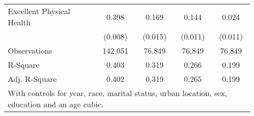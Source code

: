 \documentclass[border=3mm,preview]{standalone}
\begin{document}
\begin{landscape}
\begin{table}
\begin{tabular}{l*{4}{c}}
Excellent Physical Health&       0.398\sym{***}&       0.169\sym{***}&       0.144\sym{***}&       0.024\sym{*}  \\
                    &     (0.008)         &     (0.015)         &     (0.011)         &     (0.011)         \\
\midrule
Observations        &      142,051         &       76,849         &       76,849         &       76,849         \\
R-Square            &       0.403         &       0.319         &       0.266         &       0.199         \\
Adj. R-Square       &       0.402         &       0.319         &       0.265         &       0.199         \\
\bottomrule
\multicolumn{5}{l}{\scriptsize{With controls for year, race, marital status, urban location, sex, education and an age cubic.}} \\
\end{tabular}
\end{table}
\end{landscape}
\end{document}
